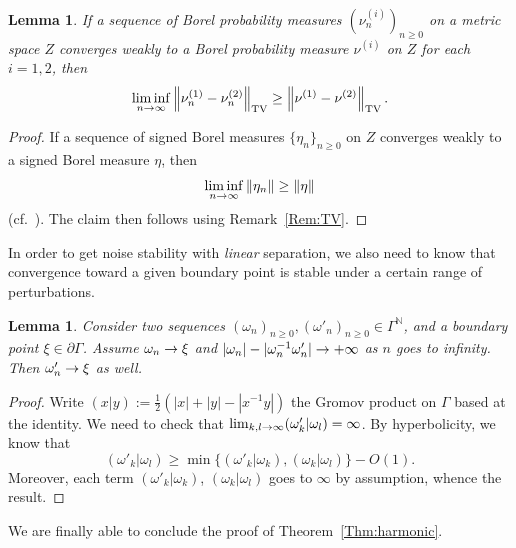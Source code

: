 \documentclass[10pt]{amsart}
\newtheorem{lemm}[theo]{Lemma}\newtheorem{prop}[theo]{Proposition}\newtheorem{coro}[theo]{Corollary}\newtheorem{conj}[theo]{Conjecture}
\theoremstyle{definition}\newtheorem{defi}[theo]{Definition}\newtheorem{rema}[theo]{Remark}\newtheorem{exam}[theo]{Example}\newtheorem{exem}[theo]{Example}\newtheorem{nota}[theo]{Notation}
\DeclareMathOperator{\TV}{TV}
\newcommand{\N}{\mathbb{N}}
\renewcommand{\(}{\left(}
\renewcommand{\)}{\right)}
\renewcommand*{\to}{\mathchoice{\longrightarrow}{\rightarrow}{\rightarrow}{\rightarrow}}
\begin{document}
\begin{lemm}\label{Lem:weak}
If a sequence of Borel probability measures $(\nu_n^{(i)})_{n\geq 0}$ on a metric space $Z$ converges weakly to a Borel probability measure $\nu^{(i)}$ on $Z$ for each $i=1, 2$, then
\[
\liminf_{n \to \infty}\left\|\nu_n^{(1)}-\nu_n^{(2)}\right\|_{\TV} \ge \left\|\nu^{(1)}-\nu^{(2)}\right\|_{\TV}.
\]
\end{lemm}


\begin{proof}
If a sequence of signed Borel measures $\{\eta_n\}_{n \geq 0}$ on $Z$ converges weakly to a signed Borel measure $\eta$, then
\[
\liminf_{n \to \infty}\|\eta_n\| \ge \|\eta\|
\]
(cf.~\cite[Theorem~4.8.1]{BogachevWeak}). The claim then follows using Remark~\ref{Rem:TV}.
\end{proof}


In order to get noise stability with \emph{linear} separation, we also need to know that convergence toward a given boundary point is stable under a certain range of perturbations.

\begin{lemm}\label{conv-perturb}
Consider two sequences $(\omega_{n})_{n\geq 0}, (\omega'_{n})_{n\geq 0}\in \Gamma^\N$, and a boundary point $\xi \in\partial \Gamma$. Assume $\omega_{n}\to \xi $ and $|\omega_{n}|-|\omega^{-1}_{n}\omega'_{n}|\to + \infty$ as $n$ goes to infinity. Then $\omega'_{n}\to \xi$ as well.
\end{lemm}

\begin{proof}
Write $(x | y):=\frac{1}{2}\left(|x|+|y|-|x^{-1}y| \right)$ the Gromov product on $\Gamma$ based at the identity.
We need to check that $\lim_{k,l\to \infty}(\omega'_{k}| \omega_{l})=\infty$. By hyperbolicity, we know that
\[
(\omega'_{k} | \omega_{l}) \geq \min\{(\omega'_{k} | \omega_{k}), (\omega_{k} | \omega_{l})\} - O(1).
\]
Moreover, each term $(\omega'_{k} | \omega_{k})$, $(\omega_{k} | \omega_{l})$ goes to $\infty$ by assumption, whence the result.
\end{proof}

We are finally able to conclude the proof of Theorem~\ref{Thm:harmonic}.
\end{document}
